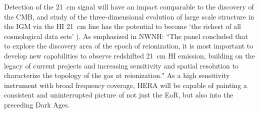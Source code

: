 \documentclass[preprint]{aastex}
\def\HI{{H{\small I }}}
\begin{document}
Detection of the 21~cm signal will have an impact
comparable to the discovery of the CMB, and study of the three-dimensional
evolution of large scale structure in the IGM via the \HI 21~cm line has the
potential to become `the richest of all cosmological data sets'
\citep{barkana_loeb2005a,loeb_zaldarriaga2004}).  As emphasized in
NWNH: ``The panel concluded that to explore the discovery
area of the epoch of reionization, it is most important to develop new
capabilities to observe redshifted 21~cm \HI emission, building on the legacy of
current projects and increasing sensitivity and spatial resolution to
characterize the topology of the gas at reionization."  
As a high
sensitivity instrument with broad frequency coverage, HERA will be capable of
painting a consistent and uninterrupted picture of not just the EoR, but also
into the preceding Dark Ages.  

\end{document}
